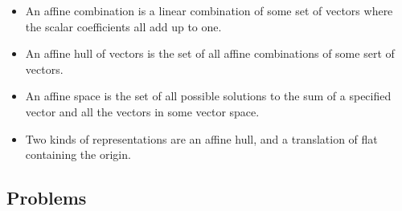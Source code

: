 \documentclass{article}
\begin{document}
\begin{itemize}
        \item An affine combination is a linear combination of some set of vectors where the scalar coefficients all add up to one.
        \item An affine hull of vectors is the set of all affine combinations of some sert of vectors.
        \item An affine space is the set of all possible solutions to the sum of a specified vector and all the vectors in some vector space.
        \item Two kinds of representations are an affine hull, and a translation of flat containing the origin.
    \end{itemize}
    \subsection{Problems}
\end{document}
